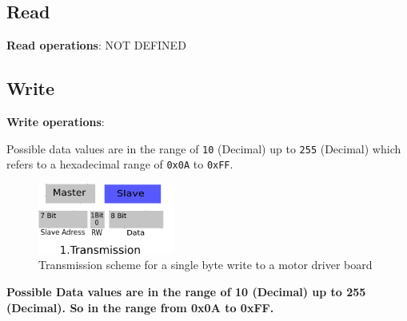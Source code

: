 \begin{itemize}

\subsection{Read}
\label{subsec:Motorread}

\textbf{Read operations}: NOT DEFINED	

\subsection{Write}
\label{subsec:Motorwrite}

\textbf{Write operations}:

Possible data values are in the range of \texttt{10} (Decimal) up to \texttt{255} (Decimal) which refers to a hexadecimal range of \texttt{0x0A} to \texttt{0xFF}.

\begin{figure}[H]
	\centering\includegraphics[width=0.4\textwidth]{fig/I2C_Adressing/Motor_write}
	\caption[Scheme for a single byte write to a motor driver board]{Transmission scheme for a single byte write to a motor driver board}
	\label{fig:Motor}
\end{figure}



\textbf{Possible Data values are in the range of 10 (Decimal) up to 255 (Decimal). So in the range from 0x0A to 0xFF.}

\end{itemize}


